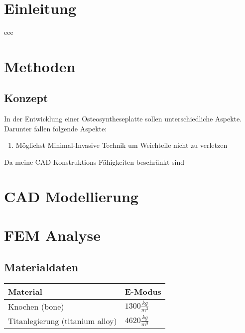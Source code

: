 
\section{Einleitung}

eee

\section{Methoden}


	\subsection{Konzept}
	
		In der Entwicklung einer Osteosyntheseplatte sollen unterschiedliche Aspekte.
		Darunter fallen folgende Aspekte:
		
		\begin{enumerate}
			\setlength{\itemsep}{0mm}
			\setlength{\parskip}{1mm}
			\item Möglichst Minimal-Invasive Technik um Weichteile nicht zu verletzen
		\end{enumerate}
		
		Da meine CAD Konstruktions-Fähigkeiten beschränkt sind 	
		

\section{CAD Modellierung}

\section{FEM Analyse}

	\subsection{Materialdaten}
		\begin{center}
			\begin{tabular}{ | p{6cm} | p{3cm} | }
				\multicolumn{1}{l}{\bfseries Material} & \multicolumn{1}{l}{\bfseries E-Modus } \\ \hline
				Knochen (bone) & $ 1300 \frac{kg}{m^3} $ \\ \hline
				Titanlegierung (titanium alloy) & $ 4620 \frac{kg}{m^3} $ \\ \hline
			\end{tabular}
			\label{fig:device3}
		\end{center}

